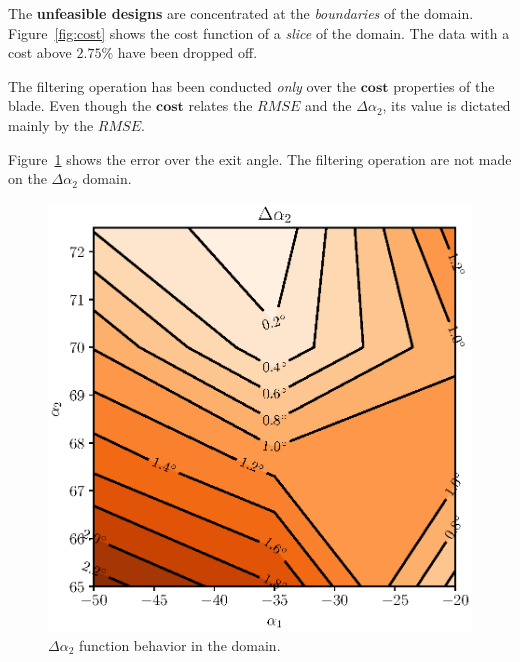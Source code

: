 The \textbf{unfeasible designs} are concentrated at the \textit{boundaries} of the domain.
Figure~\ref{fig:cost} shows the cost function of a \textit{slice} of the domain. The data 
with a cost above $2.75\%$ have been dropped off. 

The filtering operation has been conducted \textit{only} over the $\boldsymbol{cost}$ properties of the blade.
Even though the $\boldsymbol{cost}$ relates the $RMSE$ and the $\Delta \alpha_2$, its value is dictated mainly by the $RMSE$.

Figure~\ref{fig:angleError} shows the error over the exit angle. The filtering operation are not made on the 
$\Delta \alpha_2$ domain.

\begin{figure}[H]
    \centering
    \includegraphics[scale=\scaleContour]{./images/angleError.eps}
    \caption{$\Delta \alpha_2$ function behavior in the domain.}
    \label{fig:angleError}
\end{figure}
